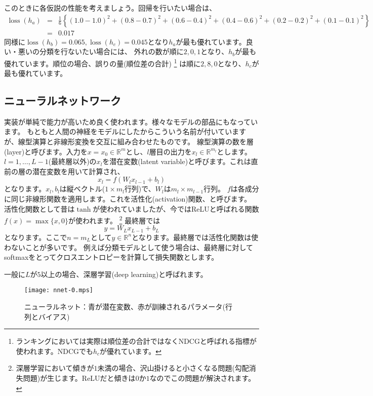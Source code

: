 \documentclass[a4j]{jarticle}
\newcommand{\R}[0]{\mathbb{R}}
\DeclareMathOperator{\loss}{loss}
\begin{document}
このときに各仮説の性能を考えましょう。回帰を行いたい場合は、
\begin{eqnarray*}
\loss(h_a) &=& \frac16\left\{(1.0-1.0)^2+(0.8-0.7)^2+(0.6-0.4)^2+(0.4-0.6)^2+(0.2-0.2)^2+(0.1-0.1)^2\right\} \\
                 &=& 0.017
\end{eqnarray*}
同様に$\loss(h_b)=0.065, \loss(h_c)=0.045$となり$h_a$が最も優れています。良い・悪いの分類を行ないたい場合には、
外れの数が順に$2, 0, 1$となり、$h_b$が最も優れています。順位の場合、誤りの量(順位差の合計)
\footnote{ランキングにおいては実際は順位差の合計ではなくNDCGと呼ばれる指標が使われます。NDCGでも$h_c$が優れています。}
は順に$2, 8, 0$となり、$h_c$が最も優れています。

\subsection{ニューラルネットワーク}
実装が単純で能力が高いため良く使われます。様々なモデルの部品にもなっています。
もともと人間の神経をモデルにしたからこういう名前が付いていますが、線型演算と非線形変換を交互に組み合わせたものです。
線型演算の数を層(layer)と呼びます。入力を$x=x_0\in\R^m$とし、$l$層目の出力を$x_l\in\R^{m_l}$とします。
$l=1,\ldots,L-1$(最終層以外)の$x_l$を潜在変数(latent variable)と呼びます。これは直前の層の潜在変数を用いて計算され、
$$x_l = f(W_l x_{l-1}+b_l)$$
となります。$x_l, b_l$は縦ベクトル($1\times m_l$行列)で、$W_l$は$m_l\times m_{l-1}$行列。
$f$は各成分に同じ非線形関数を適用します。これを活性化(activation)関数、と呼びます。
活性化関数として昔は$\tanh$が使われていましたが、今ではReLUと呼ばれる関数$f(x)=\max\{x,0\}$が使われます。
\footnote{深層学習において傾きが$1$未満の場合、沢山掛けると小さくなる問題(勾配消失問題)が生じます。ReLUだと傾きは$0$か$1$なのでこの問題が解決されます。}
最終層では
$$y = W_L x_{L-1} + b_L$$
となります。ここで$n=m_L$として$y\in\R^n$となります。最終層では活性化関数は使わないことが多いです。
例えば分類モデルとして使う場合は、最終層に対してsoftmaxをとってクロスエントロピーを計算して損失関数とします。

一般に$L$が$5$以上の場合、深層学習(deep learning)と呼ばれます。
\begin{figure}[h]
  \centering
  \texttt{[image: nnet-0.mps]}
\caption{ニューラルネット：青が潜在変数、赤が訓練されるパラメータ(行列とバイアス)}
\end{figure}
\end{document}
